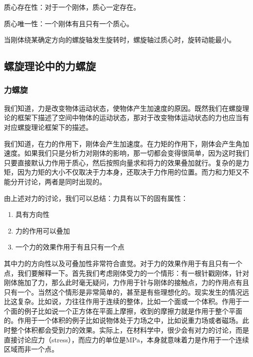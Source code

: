 \documentclass[12pt, a4paper, article, UTF8]{ctexart}
\begin{document}
\begin{mytheorem}
质心存在性：对于一个刚体，质心一定存在。
\end{mytheorem}

\begin{mytheorem}
质心唯一性：一个刚体有且只有一个质心。
\end{mytheorem}

\begin{mytheorem}
当刚体绕某确定方向的螺旋轴发生旋转时，螺旋轴过质心时，旋转动能最小。
\end{mytheorem}


\subsection{螺旋理论中的力螺旋}
\subsubsection{力螺旋}
我们知道，力是改变物体运动状态，使物体产生加速度的原因。既然我们在螺旋理论的框架下描述了空间中物体的运动状态，那对于改变物体运动状态的力也应当有对应螺旋理论框架下的描述。

我们知道，在力的作用下，刚体会产生加速度。在力矩的作用下，刚体会产生角加速度。如果我们只是分析力对刚体的影响，那一切都会变得很简单，因为这时我们只要直接默认力作用于质心，然后按照向量求和将力的效果叠加就行。复杂的是力矩，因为力矩的大小不仅取决于力本身，还取决于力作用的位置。而力和力矩又不能分开讨论，两者是同时出现的。

由上述对力的讨论，我们可以总结：力具有以下的固有属性：
\begin{enumerate}
\item 具有方向性
\item 力的作用可以叠加
\item 一个力的效果作用于有且只有一个点
\end{enumerate}
其中力的方向性以及可叠加性非常符合直觉。对于力的效果作用于有且只有一个点，我们要解释一下。首先我们考虑刚体受力的一个情形：有一根针戳刚体，针对刚体施加了力，那么此时毫无疑问，力作用于针与刚体的接触点，力的作用点有且只有一个。当然这个情形是非常简单的，甚至是有些理想化的。现实发生的情况远比这复杂。比如说，力往往作用于连续的整体，比如一个面或一个体积。作用于一个面的例子比如说一个正方体在平面上摩擦，收到的摩擦力就是作用于整个平面的。作用于一个体积的例子比如说物体处于力场之中，比如说重力场或者磁场。此时整个体积都会受到力的效果。实际上，在材料学中，很少会有对力的讨论，而是直接讨论应力（stress），而应力的单位是MPa，本身就意味着力是作用于一个连续区域而非一个点。
\end{document}
